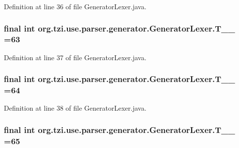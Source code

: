 Definition at line 36 of file Generator\-Lexer.\-java.

\hypertarget{classorg_1_1tzi_1_1use_1_1parser_1_1generator_1_1_generator_lexer_a1aba1c163484412d3460bdd4bb47ea89}{
\subsubsection[{T\-\_\-\-\_\-63}]{\setlength{\rightskip}{0pt plus 5cm}final int org.\-tzi.\-use.\-parser.\-generator.\-Generator\-Lexer.\-T\-\_\-\-\_ =63\hspace{0.3cm}{\ttfamily [static]}}}\label{classorg_1_1tzi_1_1use_1_1parser_1_1generator_1_1_generator_lexer_a1aba1c163484412d3460bdd4bb47ea89}


Definition at line 37 of file Generator\-Lexer.\-java.

\hypertarget{classorg_1_1tzi_1_1use_1_1parser_1_1generator_1_1_generator_lexer_af567eb66657b7b1c1399f5d07d338921}{
\subsubsection[{T\-\_\-\-\_\-64}]{\setlength{\rightskip}{0pt plus 5cm}final int org.\-tzi.\-use.\-parser.\-generator.\-Generator\-Lexer.\-T\-\_\-\-\_ =64\hspace{0.3cm}{\ttfamily [static]}}}\label{classorg_1_1tzi_1_1use_1_1parser_1_1generator_1_1_generator_lexer_af567eb66657b7b1c1399f5d07d338921}


Definition at line 38 of file Generator\-Lexer.\-java.

\hypertarget{classorg_1_1tzi_1_1use_1_1parser_1_1generator_1_1_generator_lexer_a9eb2f96cbb070ae247e224fb470a241c}{
\subsubsection[{T\-\_\-\-\_\-65}]{\setlength{\rightskip}{0pt plus 5cm}final int org.\-tzi.\-use.\-parser.\-generator.\-Generator\-Lexer.\-T\-\_\-\-\_ =65\hspace{0.3cm}{\ttfamily [static]}}}\label{classorg_1_1tzi_1_1use_1_1parser_1_1generator_1_1_generator_lexer_a9eb2f96cbb070ae247e224fb470a241c}


